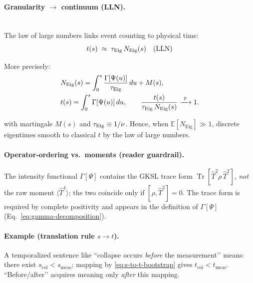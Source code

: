 \documentclass[12pt,a4paper]{article}
\renewcommand{\Tr}{\operatorname{Tr}}
\numberwithin{equation}{section}
\begin{document}
\vspace{0.5cm}

\paragraph{Granularity $\to$ continuum (LLN).}

\vspace{0.5cm}
~\\ 

\noindent The law of large numbers links event counting to physical time:
\begin{equation}
t(s) \;\approx\; \tau_{\rm Eig}\,N_{\rm Eig}(s) \quad\text{(LLN)}
\label{eq:countingtotime-relation}
\end{equation}

\noindent More precisely:
\begin{align}
&N_{\mathrm{Eig}}(s)=\int_0^s \frac{\Gamma[\Psi(u)]}{\tau_{\rm Eig}}\,du + M(s), \notag\\
&t(s)=\int_0^s \Gamma[\Psi(u)]\,du, \qquad
\frac{t(s)}{\tau_{\rm Eig}\,N_{\mathrm{Eig}}(s)} \xrightarrow{\ \mathbb{P}\ } 1. \notag
\end{align}

\vspace{0.5cm}

\noindent with martingale $M(s)$ and $\tau_{\rm Eig}\equiv 1/\nu$. Hence, when $\mathbb{E}[N_{\mathrm{Eig}}]\gg1$, discrete eigentimes smooth to classical $t$ by the law of large numbers.

\vspace{0.5cm}

\paragraph{Operator‑ordering vs.\ moments (reader guardrail).}
The intensity functional $\Gamma[\Psi]$ contains the GKSL trace form 
$\Tr[\hat T^{2}\rho\,\hat T^{2}]$, \emph{not} the raw moment $\langle \hat T^{4}\rangle$; 
the two coincide only if $[\rho,\hat T^2]=0$. The trace form is required by complete 
positivity and appears in the definition of $\Gamma[\Psi]$ (Eq.~\eqref{eq:gamma-decomposition}).

\vspace{0.5cm}

\paragraph{Example (translation rule $s\to t$).}
A temporalized sentence like “collapse occurs \emph{before} the measurement’’ means: there exist $s_{\mathrm{col}}<s_{\mathrm{meas}}$; mapping by \eqref{eq:s-to-t-bootstrap} gives $t_{\mathrm{col}}<t_{\mathrm{meas}}$. “Before/after’’ acquires meaning only \emph{after} this mapping.
\end{document}
